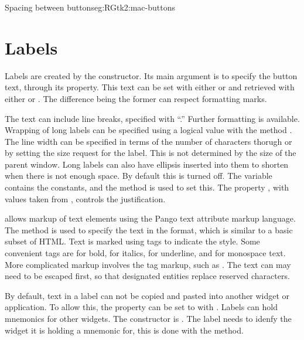\begin{example}{Spacing between buttons}{eg:RGtk2:mac-buttons}
\end{example}

\section{Labels}
\label{sec:RGtk2:gtkLabel}

Labels are created by the  constructor. Its main
argument is  to specify the button text,
through its  property. This text can be set with either
 or  and
retrieved with either  or .
The difference being the former can respect formatting marks. 

The text can include line breaks, specified with ``\code{\backslashn}.''
Further formatting is available. Wrapping of long labels can be
specified using a logical value with the method
. The line width can be specified in
terms of the number of characters thorugh
 or by setting the size request for
the label. This is not determined by the size of the parent
window. Long labels can also have ellipsis inserted into them to
shorten when there is not enough space. By default this is turned
off. The variable  contains the constants,
and the method  is used to set this.
The property , with values taken from
, controls the justification.


\GTK\/ allows markup of text elements using the Pango text attribute
markup language. The method  is used to
specify the text in the format, which is similar to a basic subset of
HTML. Text is marked using tags to indicate the style. Some convenient
tags are  for bold,  for italics,  for
underline, and  for monospace text. More complicated markup
involves the  tag markup, such as . The text can may need to be escaped first, so that designated entities replace reserved characters.



By default, text in a label can not be copied and pasted into another
widget or application. To allow this, the  property
can be set to  with .
Labels can hold mnemonics for other widgets. The constructor is
. The label needs to idenfy the widget
it is holding a mnemonic for, this is done with the
 method.

